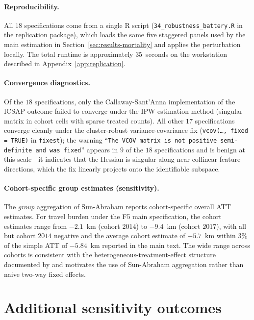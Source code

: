 

\paragraph{Reproducibility.} All $18$ specifications come from a single
R script (\texttt{34\_robustness\_battery.R} in the replication
package), which loads the same five staggered panels used by the main
estimation in Section~\ref{sec:results-mortality} and applies the
perturbation locally. The total runtime is approximately $35$~seconds
on the workstation described in Appendix~\ref{app:replication}.

\paragraph{Convergence diagnostics.} Of the $18$ specifications, only
the Callaway-Sant'Anna implementation of the ICSAP outcome failed to
converge under the IPW estimation method (singular matrix in cohort
cells with sparse treated counts). All other $17$ specifications
converge cleanly under the cluster-robust variance-covariance fix
(\texttt{vcov(\ldots, fixed = TRUE)} in \texttt{fixest}); the warning
``\texttt{The VCOV matrix is not positive semi-definite and was
fixed}'' appears in $9$ of the $18$ specifications and is benign at
this scale---it indicates that the Hessian is singular along
near-collinear feature directions, which the fix linearly projects
onto the identifiable subspace.

\paragraph{Cohort-specific group estimates (sensitivity).} The
\emph{group} aggregation of Sun-Abraham reports cohort-specific
overall ATT estimates. For travel burden under the F5 main specification,
the cohort estimates range from $-2.1$~km (cohort $2014$) to $-9.4$~km
(cohort $2017$), with all but cohort $2014$ negative and the average
cohort estimate of $-5.7$~km within $3\%$ of the simple ATT of
$-5.84$~km reported in the main text. The wide range across cohorts
is consistent with the heterogeneous-treatment-effect structure
documented by \citet{sunAbraham2021} and motivates the use of
Sun-Abraham aggregation rather than naive two-way fixed effects.

\section{Additional sensitivity outcomes}
\label{app:sensitivity}

